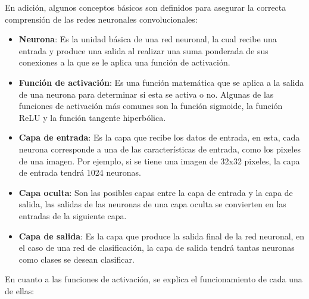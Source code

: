 En adición, algunos conceptos básicos son definidos para asegurar la 
correcta comprensión de las redes neuronales convolucionales:

\begin{itemize}
    \item \textbf{Neurona}:
    Es la unidad básica de una red neuronal, la cual recibe una entrada
    y produce una salida al realizar una suma ponderada de sus conexiones
    a la que se le aplica una función de activación.
    \item \textbf{Función de activación}:
    Es una función matemática que se aplica a la salida de una neurona
    para determinar si esta se activa o no. Algunas de las funciones
    de activación más comunes son la función sigmoide, la función ReLU
    y la función tangente hiperbólica.
    \item \textbf{Capa de entrada}:
    Es la capa que recibe los datos de entrada, en esta, cada neurona
    corresponde a una de las características de entrada, como los pixeles
    de una imagen.
    Por ejemplo, si se tiene una imagen de 32x32 pixeles, la capa de
    entrada tendrá 1024 neuronas.
    \item \textbf{Capa oculta}:
    Son las posibles capas entre la capa de entrada y la capa de salida,
    las salidas de las neuronas de una capa oculta se convierten en las
    entradas de la siguiente capa.
    \item \textbf{Capa de salida}:
    Es la capa que produce la salida final de la red neuronal, en el caso
    de una red de clasificación, la capa de salida tendrá tantas neuronas
    como clases se desean clasificar.\cite{medium_cnn}
\end{itemize}


En cuanto a las funciones de activación, se explica el funcionamiento de 
cada una de ellas:

